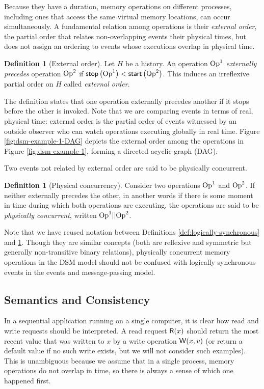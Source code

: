 \documentclass[]             %
{NASA}                       %
\theoremstyle{definition}
\newtheorem{definition}[theorem]{Definition}
\begin{document}
Because they have a duration, memory operations on different
processes, including ones that access the same virtual memory
locations, can occur simultaneously. A fundamental relation among
operations is their \emph{external order}, the partial order that
relates non-overlapping events their physical times, but does not
assign an ordering to events whose executions overlap in physical
time.
\begin{definition}[External order]
  \label{def:external-order}
  Let $H$ be a history. An operation $\mathrm{Op}^1$ \emph{externally
    precedes} operation $\mathrm{Op}^2$ if
  $\mathsf{stop}\left(\mathrm{Op}^1\right) < \mathsf{start}\left(\mathrm{Op}^2\right)$. This induces an irreflexive
  partial order on $H$ called \emph{external order}.
\end{definition}
The definition states that one operation externally precedes another
if it stops before the other is invoked. Note that we are comparing
events in terms of real, physical time: external order is the partial
order of events witnessed by an outside observer who can watch
operations executing globally in real time. Figure
\ref{fig:dsm-example-1-DAG} depicts the external order among the
operations in Figure \ref{fig:dsm-example-1}, forming a directed
acyclic graph (DAG).

Two events not related by external order are said to be physically
concurrent.

\begin{definition}[Physical concurrency]
  \label{def:physical-concurrency}
  Consider two operations $\mathrm{Op}^1$ and $\mathrm{Op}^2$. If neither externally
  precedes the other, in another words if there is some moment in time
  during which both operations are executing, the operations are said
  to be \emph{physically concurrent}, written $\mathrm{Op}^1 || \mathrm{Op}^2$.
\end{definition}

Note that we have reused notation between Definitions
\ref{def:logically-synchronous} and \ref{def:physical-concurrency}.
Though they are similar concepts (both are reflexive and symmetric but
generally non-transitive binary relations), physically concurrent
memory operations in the DSM model should not be confused with
logically synchronous events in the events and message-passing model.

\subsection{Semantics and Consistency}
In a sequential application running on a single computer, it is clear
how read and write requests should be interpreted. A read request
$\mathsf{R}\!\left(x\right)$ should return the most recent value that was written to
$x$ by a write operation $\mathsf{W}\!\left(x, v\right)$ (or return a default value
if no such write exists, but we will not consider such examples). This
is unambiguous because we assume that in a single process, memory
operations do not overlap in time, so there is always a sense of which
one happened first. %
\end{document}
